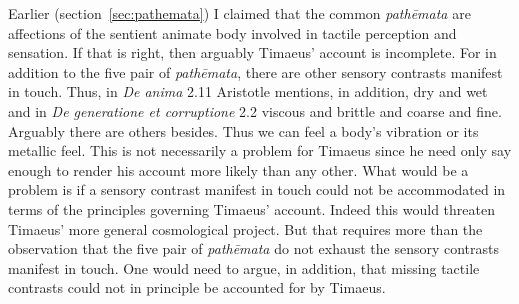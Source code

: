 Earlier (section~\ref{sec:pathemata}) I claimed that the common \emph{pathēmata} are affections of the sentient animate body involved in tactile perception and sensation. If that is right, then arguably Timaeus' account is incomplete. For in addition to the five pair of \emph{pathēmata}, there are other sensory contrasts manifest in touch. Thus, in \emph{De anima} 2.11 Aristotle mentions, in addition, dry and wet and in \emph{De generatione et corruptione} 2.2 viscous and brittle and coarse and fine. Arguably there are others besides. Thus we can feel a body's vibration or its metallic feel. This is not necessarily a problem for Timaeus since he need only say enough to render his account more likely than any other. What would be a problem is if a sensory contrast manifest in touch could not be accommodated in terms of the principles governing Timaeus' account. Indeed this would threaten Timaeus' more general cosmological project. But that requires more than the observation that the five pair of \emph{pathēmata} do not exhaust the sensory contrasts manifest in touch. One would need to argue, in addition, that missing tactile contrasts could not in principle be accounted for by Timaeus.




